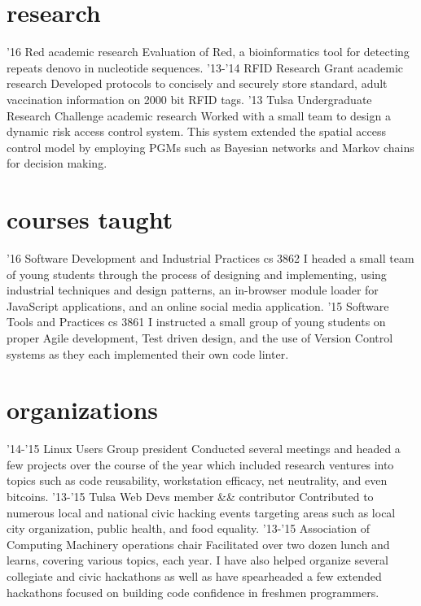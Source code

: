 \documentclass[print]{friggeri-cv}
\begin{document}
\section{research}

\begin{entrylist}
  \entry
    {'16}
    {Red}
    {academic research}
    {Evaluation of Red, a bioinformatics tool for detecting repeats denovo in nucleotide sequences.}
  \entry
    {'13-'14}
    {RFID Research Grant}
    {academic research}
    {Developed protocols to concisely and securely store standard, adult vaccination information on 2000 bit RFID tags.}
  \entry
    {'13}
    {Tulsa Undergraduate Research Challenge}
    {academic research}
    {Worked with a small team to design a dynamic risk access control system. This system extended the spatial access control model by employing PGMs such as Bayesian networks and Markov chains for decision making.}
\end{entrylist}

\section{courses taught}

\begin{entrylist}
  \entry
    {'16}
    {Software Development and Industrial Practices}
    {cs 3862}
    {I headed a small team of young students through the process of designing and implementing, using industrial techniques and design patterns, an in-browser module loader for JavaScript applications, and an online social media application.}
  \entry
    {'15}
    {Software Tools and Practices}
    {cs 3861}
    {I instructed a small group of young students on proper Agile development, Test driven design, and the use of Version Control systems as they each implemented their own code linter.}
\end{entrylist}

\section{organizations}

\begin{entrylist}
  \entry
    {'14-'15}
    {Linux Users Group}
    {president}
    {Conducted several meetings and headed a few projects over the course of the year which included research ventures into topics such as code reusability, workstation efficacy, net neutrality, and even bitcoins.}
  \entry
    {'13-'15}
    {Tulsa Web Devs}
    {member \&\& contributor}
    {Contributed to numerous local and national civic hacking events targeting areas such as local city organization, public health, and food equality.}
  \entry
    {'13-'15}
    {Association of Computing Machinery}
    {operations chair}
    {Facilitated over two dozen lunch and learns, covering various topics, each year. I have also helped organize several collegiate and civic hackathons as well as have spearheaded a few extended hackathons focused on building code confidence in freshmen programmers.}
\end{entrylist}
\end{document}
